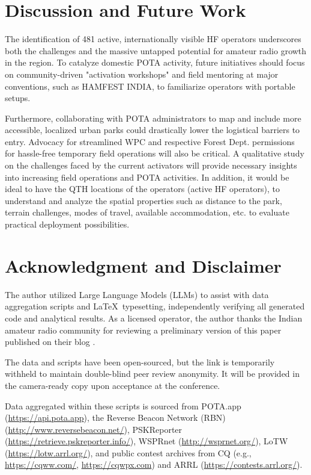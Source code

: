 \documentclass[conference]{IEEEtran}
\begin{document}
\section{Discussion and Future Work}
The identification of 481 active, internationally visible HF operators
underscores both the challenges and the massive untapped potential for
amateur radio growth in the region. To catalyze domestic POTA
activity, future initiatives should focus on community-driven
"activation workshops" and field mentoring at major conventions, such
as HAMFEST INDIA, to familiarize operators with portable setups.

Furthermore, collaborating with POTA administrators to map and include
more accessible, localized urban parks could drastically lower the
logistical barriers to entry. Advocacy for streamlined WPC and
respective Forest Dept. permissions for hassle-free temporary field
operations will also be critical. A qualitative study on the
challenges faced by the current activators will provide necessary
insights into increasing field operations and POTA activities. In
addition, it would be ideal to have the QTH locations of the operators
(active HF operators), to understand and analyze the spatial
properties such as distance to the park, terrain challenges, modes of
travel, available accommodation, etc. to evaluate practical deployment
possibilities.

\section{Acknowledgment and Disclaimer}
The author utilized Large Language Models (LLMs) to assist with data
aggregation scripts and \LaTeX\ typesetting, independently verifying
all generated code and analytical results. As a licensed operator, the
author thanks the Indian amateur radio community for reviewing a
preliminary version of this paper published on their blog \cite{b17}.

The data and scripts have been open-sourced, but the link is
temporarily withheld to maintain double-blind peer review anonymity.
It will be provided in the camera-ready copy upon acceptance at the
conference. {\raggedright Data aggregated within these scripts is
  sourced from POTA.app (\url{https://api.pota.app}), the Reverse
  Beacon Network (RBN) (\url{http://www.reversebeacon.net/}),
  PSKReporter (\url{https://retrieve.pskreporter.info/}), WSPRnet
  (\url{http://wsprnet.org/}), LoTW (\url{https://lotw.arrl.org/}),
  and public contest archives from CQ (e.g., \url{https://cqww.com/},
  \url{https://cqwpx.com}) and ARRL
  (\url{https://contests.arrl.org/}).\par}



\end{document}
